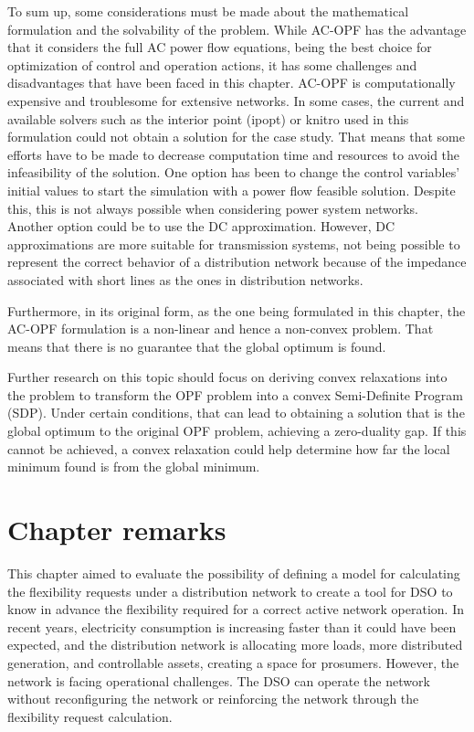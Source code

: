To sum up, some considerations must be made about the mathematical formulation and the solvability of the problem. While AC-OPF has the advantage that it considers the full AC power flow equations, being the best choice for optimization of control and operation actions, it has some challenges and disadvantages that have been faced in this chapter. AC-OPF is computationally expensive and troublesome for extensive networks. In some cases, the current and available solvers such as the interior point (ipopt) or knitro used in this formulation could not obtain a solution for the case study. That means that some efforts have to be made to decrease computation time and resources to avoid the infeasibility of the solution. One option has been to change the control variables' initial values to start the simulation with a power flow feasible solution. Despite this, this is not always possible when considering power system networks. Another option could be to use the DC approximation. However, DC approximations are more suitable for transmission systems, not being possible to represent the correct behavior of a distribution network because of the impedance associated with short lines as the ones in distribution networks. 

Furthermore, in its original form, as the one being formulated in this chapter, the AC-OPF formulation is a non-linear and hence a non-convex problem. That means that there is no guarantee that the global optimum is found. 

Further research on this topic should focus on deriving convex relaxations into the problem to transform the OPF problem into a convex Semi-Definite Program (SDP). Under certain conditions, that can lead to obtaining a solution that is the global optimum to the original OPF problem, achieving a zero-duality gap. If this cannot be achieved, a convex relaxation could help determine how far the local minimum found is from the global minimum.  

\section{Chapter remarks}
This chapter aimed to evaluate the possibility of defining a model for calculating the flexibility requests under a distribution network to create a tool for DSO to know in advance the flexibility required for a correct active network operation. In recent years, electricity consumption is increasing faster than it could have been expected, and the distribution network is allocating more loads, more distributed generation, and controllable assets, creating a space for prosumers. However, the network is facing operational challenges. The DSO can operate the network without reconfiguring the network or reinforcing the network through the flexibility request calculation.

